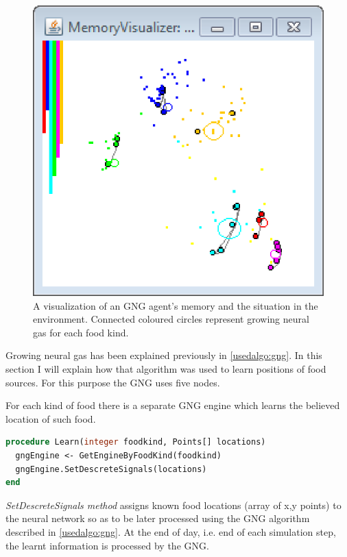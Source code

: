 \begin{figure}      
\begin{center}
\includegraphics{images/app/gng_screenshot.eps}    
\caption{A visualization of an GNG agent's memory and the situation in the environment. Connected coloured circles represent growing neural gas for each food kind.}
\end{center}                          
\label{app:gngscreenshot}
\end{figure}

Growing neural gas has been explained previously in \ref{usedalgo:gng}. In this section I will explain how that algorithm was used to learn positions of food sources. For this purpose the GNG uses five nodes.

For each kind of food there is a separate GNG engine which learns the believed location of such food. 

\begin{lstlisting}[language=Pascal]
procedure Learn(integer foodkind, Points[] locations)
  gngEngine <- GetEngineByFoodKind(foodkind)
  gngEngine.SetDescreteSignals(locations)
end
\end{lstlisting}  

\emph{SetDescreteSignals method} assigns known food locations (array of x,y points) to the neural network so as to be later processed using the GNG algorithm described in \ref{usedalgo:gng}. At the end of day, i.e. end of each simulation step, the learnt information is processed by the GNG.


